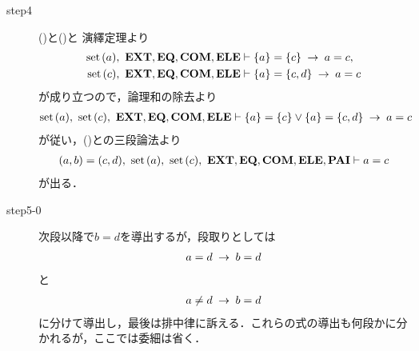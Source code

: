 \begin{sketch}
\begin{description}
			\item[step4] ()と()と
				演繹定理より
				\begin{align}
					\operatorname*{set}\hspace{0.15em}(a),\ \mbox{{\bf EXT}},\mbox{{\bf EQ}},\mbox{\bf COM},\mbox{{\bf ELE}} &\vdash \{a\} = \{c\} \hspace{0.25em}\rightarrow\hspace{0.25em} a = c, \\
					\operatorname*{set}\hspace{0.15em}(c),\ \mbox{{\bf EXT}},\mbox{{\bf EQ}},\mbox{\bf COM},\mbox{{\bf ELE}} &\vdash \{a\} = \{c,d\} \hspace{0.25em}\rightarrow\hspace{0.25em} a = c
				\end{align}
				が成り立つので，論理和の除去より
				\begin{align}
					\operatorname*{set}\hspace{0.15em}(a),\ \operatorname*{set}\hspace{0.15em}(c),\ \mbox{{\bf EXT}},\mbox{{\bf EQ}},\mbox{\bf COM},\mbox{{\bf ELE}} \vdash 
					\{a\} = \{c\} \vee \{a\} = \{c,d\} \hspace{0.25em}\rightarrow\hspace{0.25em} a = c
				\end{align}
				が従い，()との三段論法より
				\begin{align}
					(a,b) = (c,d),\ \set{a},\ \set{c},\ \EXTAX,\EQAX,\COMAX,\ELEAX,\PAIAX \vdash a = c
					\label{fom:equality_of_ordered_pairs_5}
				\end{align}
				が出る．
				
			\item[step5-0]
				次段以降で$b = d$を導出するが，段取りとしては
				\begin{align}
					a = d \hspace{0.25em}\rightarrow\hspace{0.25em} b = d
				\end{align}
				と
				\begin{align}
					a \neq d \hspace{0.25em}\rightarrow\hspace{0.25em} b = d
				\end{align}
				に分けて導出し，最後は排中律に訴える．これらの式の導出も何段かに分かれるが，ここでは委細は省く．
				

\end{description}
\end{sketch}
